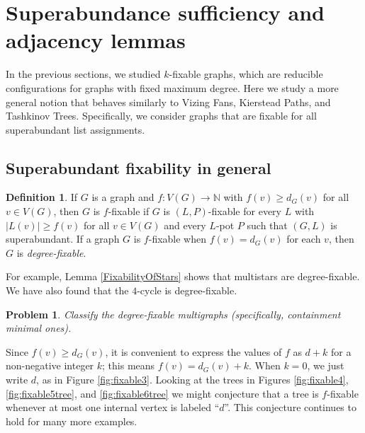 \documentclass[12pt]{article}
\theoremstyle{plain}
\newtheorem{problem}{Problem}
\theoremstyle{definition}
\newtheorem{defn}{Definition}
\theoremstyle{remark}
\newcommand{\IN}{\mathbb{N}}
\newcommand{\func}[3]{#1\colon #2 \rightarrow #3}
\begin{document}
\section{Superabundance sufficiency and adjacency lemmas}
In the previous sections, we studied $k$-fixable graphs, which are reducible
configurations for graphs with fixed maximum degree.  Here we study a more
general notion that behaves similarly to Vizing Fans, Kierstead Paths, and
Tashkinov Trees.  Specifically, we consider graphs that are fixable for all
superabundant list assignments.  

\subsection{Superabundant fixability in general}
	
\begin{defn}
If $G$ is a graph and $\func{f}{V(G)}{\IN}$ with $f(v) \ge d_G(v)$ for all $v
\in V(G)$, then $G$ is $f$-fixable if $G$ is $(L, P)$-fixable for every $L$
with $|L(v)| \ge f(v)$ for all $v \in V(G)$ and every $L$-pot $P$ such that
$(G,L)$ is superabundant.  If a graph $G$ is $f$-fixable when $f(v)=d_G(v)$ for
each $v$, then $G$ is \emph{degree-fixable}.
\end{defn}
	
For example, Lemma \ref{FixabilityOfStars} shows that multistars are
degree-fixable.  We have also found that the $4$-cycle is degree-fixable.
	
\begin{problem}
Classify the degree-fixable multigraphs (specifically, containment minimal
ones).
\end{problem} 
	
Since $f(v) \ge d_G(v)$, it is convenient to express the values of $f$ as $d+k$
for a non-negative integer $k$; this means $f(v) = d_G(v) + k$.  When $k=0$, we
just write $d$, as in Figure \ref{fig:fixable3}.
%
Looking at the trees in Figures \ref{fig:fixable4}, \ref{fig:fixable5tree}, and
\ref{fig:fixable6tree} we might conjecture that a tree is $f$-fixable whenever
at most one internal vertex is labeled ``$d$''.  This conjecture
continues to hold for many more examples.
	
\end{document}
